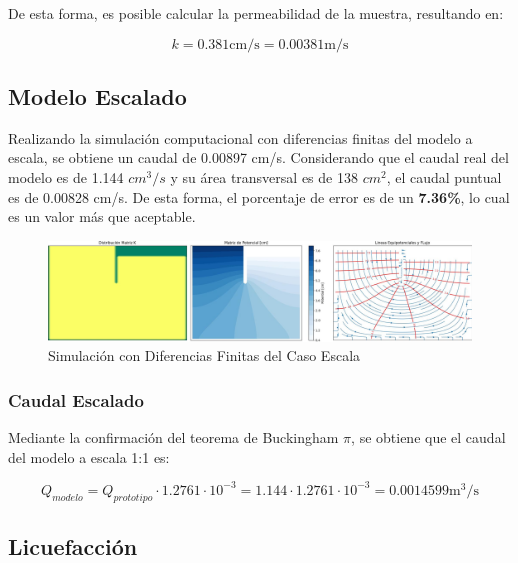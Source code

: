 De esta forma, es posible calcular la permeabilidad de la muestra, resultando en:

\begin{equation}
    k = 0.381 \text{cm/s} = 0.00381 \text{m/s}
\end{equation}

\subsection{Modelo Escalado}

Realizando la simulación computacional con diferencias finitas del modelo a escala, se obtiene un caudal de 0.00897 cm/s. Considerando que el caudal real del modelo es de 1.144 $cm^3/s$ y su área transversal es de 138 $cm^2$, el caudal puntual es de 0.00828 cm/s. De esta forma, el porcentaje de error es de un \textbf{7.36\%}, lo cual es un valor más que aceptable.

\begin{figure}[H]
    \centering
    \includegraphics[width=1\textwidth]{GRAFICOS/laplace_escala_cm.jpg}
    \caption{Simulación con Diferencias Finitas del Caso Escala}
    \label{fig:maqueta_caso_1}
\end{figure}

\subsubsection{Caudal Escalado}

Mediante la confirmación del teorema de Buckingham $\pi$, se obtiene que el caudal del modelo a escala 1:1 es:

\begin{equation}
    Q_{modelo} = Q_{prototipo} \cdot 1.2761 \cdot 10^{-3} = 1.144 \cdot 1.2761 \cdot 10^{-3} = 0.0014599 \text{m}^3/\text{s}
\end{equation}


\newpage
\subsection{Licuefacción}

